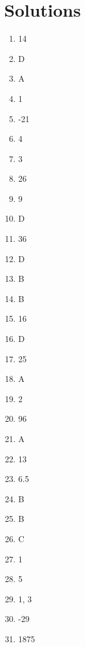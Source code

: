 \documentclass[../satmath.tex]{subfiles}
\begin{document}
\section*{Solutions}
\begin{enumerate}[label=\bfseries\arabic*.]

\item 14
\item D
\item A
\item 1
\item -21
\item 4
\item 3
\item 26
\item 9
\item D
\item 36
\item D
\item B
\item B
\item 16
\item D
\item 25
\item A
\item 2
\item 96
\item A
\item 13
\item 6.5
\item B
\item B
\item C
\item 1
\item 5
\item 1, 3
\item -29
\item 1875
\end{enumerate}
\end{document}
